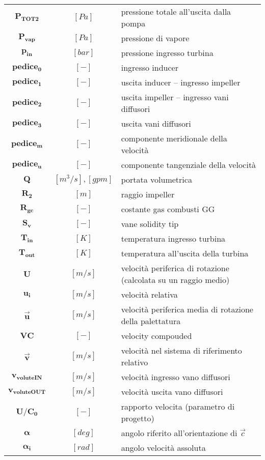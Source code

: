 \begin{multicols}{2}
{\begin{xltabular}{\linewidth}{cc>{\raggedright\arraybackslash}X}
        $\bm{P_{TOT 2}}$ & $[Pa]$ & pressione totale all'uscita dalla pompa \\
	    $\bm{P_{vap}}$ & $[Pa]$ & pressione di vapore \\
		$\bm{p_{in}}$ & $[bar]$ & pressione ingresso turbina \\
		$\bm{pedice_0}$ & $[-]$ & ingresso inducer \\
        $\bm{pedice_1}$ & $[-]$ & uscita inducer – ingresso impeller \\
        $\bm{pedice_2}$ & $[-]$ & uscita impeller – ingresso vani diffusori \\
		$\bm{pedice_3}$ & $[-]$ & uscita vani diffusori \\
		$\bm{pedice_m}$ & $[-]$ & componente meridionale della velocità \\
        $\bm{pedice_u}$ & $[-]$ & componente tangenziale della velocità \\
        $\bm{Q}$ & $[m^3/s], [gpm]$ & portata volumetrica \\
		$\bm{R_2}$ & $[m]$ & raggio impeller \\
		$\bm{R_{gc}}$ & $[-]$ & costante gas combusti GG \\
		$\bm{S_v}$ & $[-]$ & vane solidity tip \\
		$\bm{T_{in}}$ & $[K]$ & temperatura ingresso turbina\\
		$\bm{T_{out}}$ & $[K]$ & temperatura all'uscita della turbina\\
		$\bm{U}$ & $[m/s]$ & velocità periferica di rotazione (calcolata su un raggio medio) \\
		$\bm{u_i}$ & $[m/s]$ & velocità relativa \\
        $\bm{\overrightarrow{u}}$ & $[m/s]$ & velocità periferica media di rotazione della palettatura \\
		$\bm{VC}$ & $[-]$ & velocity compouded\\
        $\bm{\overrightarrow{v}}$ & $[m/s]$ & velocità nel sistema di riferimento relativo \\
		$\bm{{v_{voluteIN}}}$ & $[m/s]$ & velocità ingresso vano diffusori \\
		$\bm{{v_{voluteOUT}}}$ & $[m/s]$ & velocità uscita vano diffusori \\
		$\bm{U/C_0}$ & $[-]$ & rapporto velocita (parametro di progetto) \\
		$\bm{\alpha}$ & $[deg]$ & angolo riferito all'orientazione di $\overrightarrow{c}$ \\
		$\bm{\alpha_i}$ & $[rad]$ & angolo velocità assoluta \\

\end{xltabular}}
\end{multicols}
